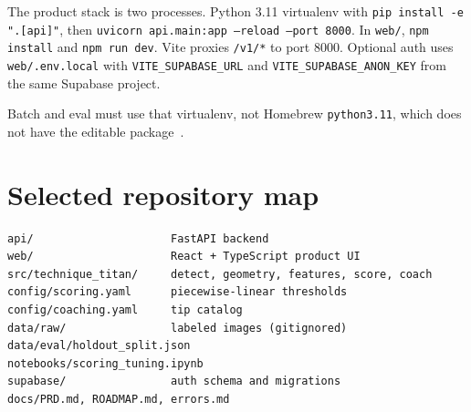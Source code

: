 \documentclass[11pt,a4paper]{article}
\newcommand{\code}[1]{\texttt{#1}}
\begin{document}
The product stack is two processes.
Python 3.11 virtualenv with \code{pip install -e ".[api]"}, then \code{uvicorn api.main:app --reload --port 8000}.
In \code{web/}, \code{npm install} and \code{npm run dev}.
Vite proxies \code{/v1/*} to port 8000.
Optional auth uses \code{web/.env.local} with \code{VITE\_SUPABASE\_URL} and \code{VITE\_SUPABASE\_ANON\_KEY} from the same Supabase project.

Batch and eval must use that virtualenv, not Homebrew \code{python3.11}, which does not have the editable package~\cite{errors}.

\section{Selected repository map}

\begin{verbatim}
api/                     FastAPI backend
web/                     React + TypeScript product UI
src/technique_titan/     detect, geometry, features, score, coach
config/scoring.yaml      piecewise-linear thresholds
config/coaching.yaml     tip catalog
data/raw/                labeled images (gitignored)
data/eval/holdout_split.json
notebooks/scoring_tuning.ipynb
supabase/                auth schema and migrations
docs/PRD.md, ROADMAP.md, errors.md
\end{verbatim}
\end{document}
